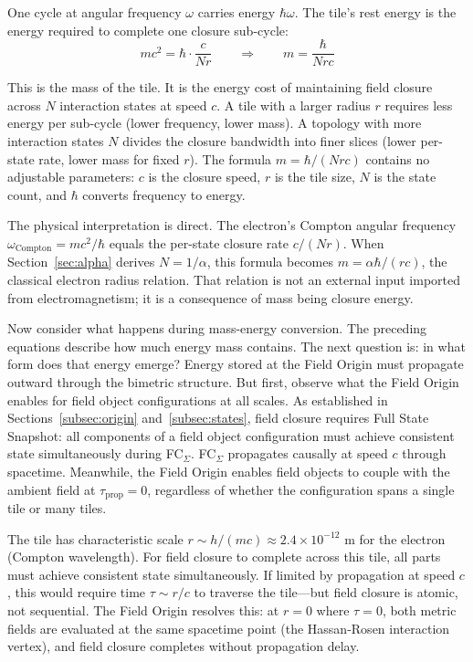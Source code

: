 \documentclass[aps,prd,preprint,superscriptaddress,showpacs,preprintnumbers,amsmath,amssymb,nofootinbib]{revtex4-2}
\begin{document}
One cycle at angular frequency $\omega$ carries energy $\hbar\omega$. The tile's rest energy is the energy required to complete one closure sub-cycle:
\begin{equation}
mc^2 = \hbar \cdot \frac{c}{Nr} \qquad \Longrightarrow \qquad m = \frac{\hbar}{Nrc}
\label{eq:mass-closure}
\end{equation}

This is the mass of the tile. It is the energy cost of maintaining field closure across $N$ interaction states at speed $c$. A tile with a larger radius $r$ requires less energy per sub-cycle (lower frequency, lower mass). A topology with more interaction states $N$ divides the closure bandwidth into finer slices (lower per-state rate, lower mass for fixed $r$). The formula $m = \hbar/(Nrc)$ contains no adjustable parameters: $c$ is the closure speed, $r$ is the tile size, $N$ is the state count, and $\hbar$ converts frequency to energy.

The physical interpretation is direct. The electron's Compton angular frequency $\omega_{\text{Compton}} = mc^2/\hbar$ equals the per-state closure rate $c/(Nr)$. When Section~\ref{sec:alpha} derives $N = 1/\alpha$, this formula becomes $m = \alpha\hbar/(rc)$, the classical electron radius relation. That relation is not an external input imported from electromagnetism; it is a consequence of mass being closure energy.

Now consider what happens during mass-energy conversion. The preceding equations describe how much energy mass contains. The next question is: in what form does that energy emerge? Energy stored at the Field Origin must propagate outward through the bimetric structure. But first, observe what the Field Origin enables for field object configurations at all scales. As established in Sections~\ref{subsec:origin} and~\ref{subsec:states}, field closure requires Full State Snapshot: all components of a field object configuration must achieve consistent state simultaneously during FC$_{\Sigma}$. FC$_{\Sigma}$ propagates causally at speed $c$ through spacetime. Meanwhile, the Field Origin enables field objects to couple with the ambient field at $\tau_{\text{prop}} = 0$, regardless of whether the configuration spans a single tile or many tiles.

The tile has characteristic scale $r \sim h/(mc) \approx 2.4 \times 10^{-12}$ m for the electron (Compton wavelength). For field closure to complete across this tile, all parts must achieve consistent state simultaneously. If limited by propagation at speed $c$, this would require time $\tau \sim r/c$ to traverse the tile---but field closure is atomic, not sequential. The Field Origin resolves this: at $r = 0$ where $\tau = 0$, both metric fields are evaluated at the same spacetime point (the Hassan-Rosen interaction vertex), and field closure completes without propagation delay.
\end{document}
